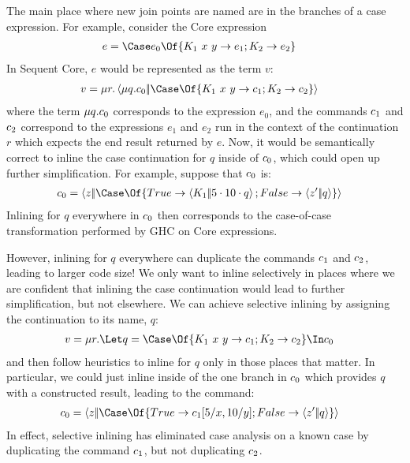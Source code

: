\documentclass{article}
\begin{document}
The main place where new join points are named are in the branches of a case
expression.  For example, consider the Core expression
\begin{align*}
  e &= \Case e_0 \Of \{ K_1 ~ x ~ y \to e_1; K_2 \to e_2 \}
\end{align*}
In Sequent Core, $e$ would be represented as the term $v$:
\begin{align*}
  v
  &=
  \comp{r}
    \cut
    {\comp{q}\cmd_0}
    {\Case\Of \{ K_1 ~ x ~ y \to \cmd_1; K_2 \to \cmd_2 \}}
\end{align*}
where the term $\mu{q}.c_0$ corresponds to the expression $e_0$, and the
commands $c_1$ and $c_2$ correspond to the expressions $e_1$ and $e_2$ run
in the context of the continuation $r$ which expects the end result returned by
$e$.  Now, it would be semantically correct to inline the case continuation for
$q$ inside of $c_0$, which could open up further simplification.  For
example, suppose that $c_0$ is:
\begin{align*}
  \cmd_0
  &=
  \cut{z}{\Case\Of \{ True \to \cut{K_1}{\app{5}{\app{10}{q}}}; False \to \cut{z'}{q} \}}
\end{align*}
Inlining for $q$ everywhere in $c_0$ then corresponds to the case-of-case
transformation performed by GHC on Core expressions.

However, inlining for $q$ everywhere can duplicate the commands $c_1$ and
$c_2$, leading to larger code size!  We only want to inline selectively in
places where we are confident that inlining the case continuation would lead to
further simplification, but not elsewhere.  We can achieve selective inlining by
assigning the continuation to its name, $q$:
\begin{align*}
  v
  &=
  \comp{r}
  \Let q = \Case\Of \{ K_1 ~ x ~ y \to \cmd_1; K_2 \to \cmd_2 \}
  \In \cmd_0
\end{align*}
and then follow heuristics to inline for $q$ only in those places that matter.
In particular, we could just inline inside of the one branch in $c_0$ which
provides $q$ with a constructed result, leading to the command:
\begin{align*}
  \cmd_0
  &=
  \cut{z}{\Case\Of \{ True \to \cmd_1[5/x,10/y]; False \to \cut{z'}{q} \}}
\end{align*}
In effect, selective inlining has eliminated case analysis on a known case by
duplicating the command $c_1$, but not duplicating $c_2$.
\end{document}
